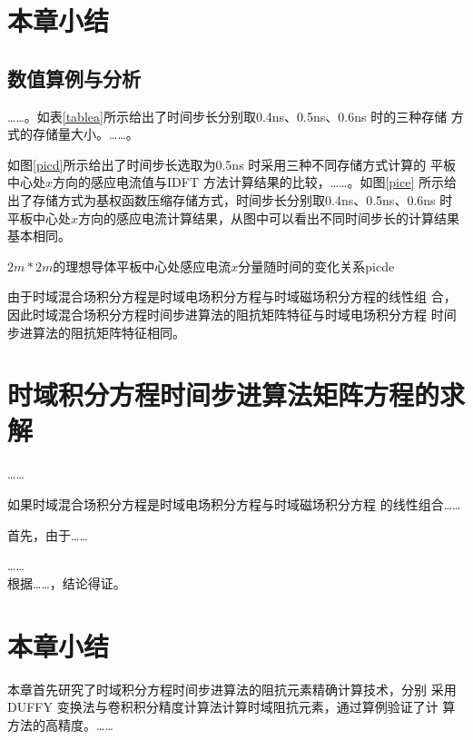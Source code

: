 \section{本章小结}


\subsection{数值算例与分析}
……。如表\ref{tablea}所示给出了时间步长分别取0.4ns、0.5ns、0.6ns 时的三种存储
方式的存储量大小。……。

如图\ref{picd}所示给出了时间步长选取为0.5ns 时采用三种不同存储方式计算的
平板中心处$x$方向的感应电流值与IDFT 方法计算结果的比较，……。如图\ref{pice}
所示给出了存储方式为基权函数压缩存储方式，时间步长分别取0.4ns、0.5ns、0.6ns
时平板中心处$x$方向的感应电流计算结果，从图中可以看出不同时间步长的计算结果基本相同。

\begin{pics}[h]{$2m*2m$的理想导体平板中心处感应电流$x$分量随时间的变化关系}{picde}
\end{pics}
%
由于时域混合场积分方程是时域电场积分方程与时域磁场积分方程的线性组
合，因此时域混合场积分方程时间步进算法的阻抗矩阵特征与时域电场积分方程
时间步进算法的阻抗矩阵特征相同。
\section{时域积分方程时间步进算法矩阵方程的求解}
……

\begin{dingli}
如果时域混合场积分方程是时域电场积分方程与时域磁场积分方程
的线性组合……
\end{dingli}
\begin{zhengming}
首先，由于……

……\\
根据……，结论得证。
\end{zhengming}
\section{本章小结}
本章首先研究了时域积分方程时间步进算法的阻抗元素精确计算技术，分别
采用DUFFY 变换法与卷积积分精度计算法计算时域阻抗元素，通过算例验证了计
算方法的高精度。……
